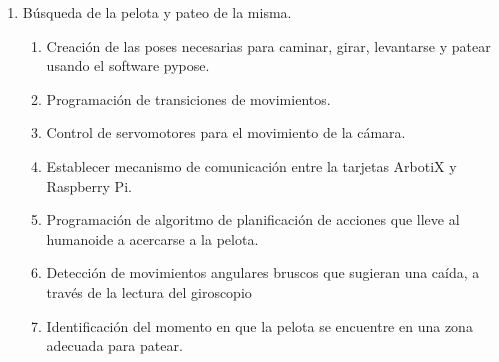 \begin{enumerate}
\item Búsqueda de la pelota y pateo de la misma. 
\begin{enumerate}
\item Creación de las poses necesarias para caminar, girar, levantarse y patear usando el software pypose.
\item Programación de transiciones de movimientos.
\item Control de servomotores para el movimiento de la cámara.
\item Establecer mecanismo de comunicación entre la tarjetas ArbotiX y Raspberry Pi.  
\item Programación de algoritmo de planificación de acciones que lleve al humanoide a acercarse a la pelota.
\item Detección de movimientos angulares bruscos que sugieran una caída, a través de la lectura del giroscopio
\item Identificación del momento en que la pelota se encuentre en una zona adecuada para patear.
\end{enumerate}
\end{enumerate}

